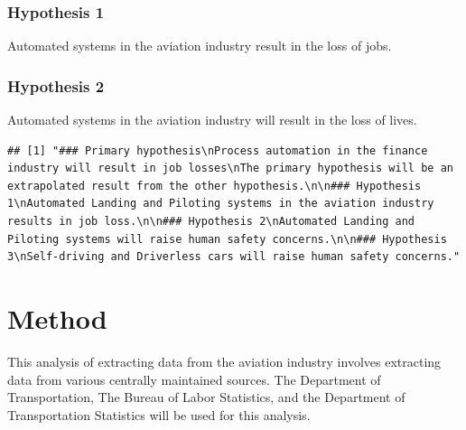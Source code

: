 \documentclass[
  man,floatsintext]{apa7}
\begin{document}
\hypertarget{hypothesis-1}{%
\subsubsection{Hypothesis 1}\label{hypothesis-1}}

Automated systems in the aviation industry result in the loss of jobs.

\hypertarget{hypothesis-2}{%
\subsubsection{Hypothesis 2}\label{hypothesis-2}}

Automated systems in the aviation industry will result in the loss of lives.

\begin{verbatim}
## [1] "### Primary hypothesis\nProcess automation in the finance industry will result in job losses\nThe primary hypothesis will be an extrapolated result from the other hypothesis.\n\n### Hypothesis 1\nAutomated Landing and Piloting systems in the aviation industry results in job loss.\n\n### Hypothesis 2\nAutomated Landing and Piloting systems will raise human safety concerns.\n\n### Hypothesis 3\nSelf-driving and Driverless cars will raise human safety concerns."
\end{verbatim}

\hypertarget{method}{%
\section{Method}\label{method}}

This analysis of extracting data from the aviation industry involves extracting data from various centrally maintained sources. The Department of Transportation, The Bureau of Labor Statistics, and the Department of Transportation Statistics will be used for this analysis.\\
\end{document}
